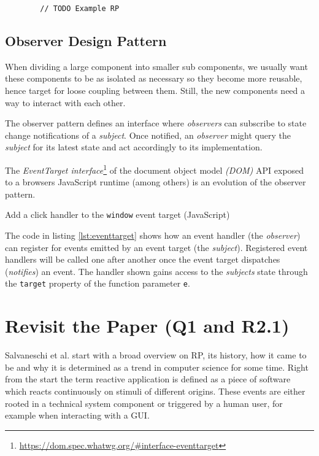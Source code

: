 \documentclass[12pt,a4paper]{article}
\begin{document}
\begin{listing}[H]
	\begin{verbatim}
		// TODO Example RP
	\end{verbatim}
	\caption{}
	\label{lst:basic-rp-with-rxjs}
\end{listing}

\subsection{Observer Design Pattern}
When dividing a large component into smaller sub components, we usually want these components to be as isolated as necessary so they become more reusable, hence target for loose coupling between them. Still, the new components need a way to interact with each other.

The observer pattern \cite{gamma1995design} defines an interface where \emph{observers} can subscribe to state change notifications of a \emph{subject}. Once notified, an \emph{observer} might query the \emph{subject} for its latest state and act accordingly to its implementation.

The \emph{EventTarget interface}\footnote{\url{https://dom.spec.whatwg.org/\#interface-eventtarget}} of the document object model \emph{(DOM)} API exposed to a browsers JavaScript runtime (among others) is an evolution of the observer pattern.

\begin{listing}[H]
	\caption{Add a click handler to the \texttt{window} event target (JavaScript)}
	\label{lst:eventtarget}
\end{listing}

The code in listing \ref{lst:eventtarget} shows how an event handler (the \emph{observer}) can register for events emitted by an event target (the \emph{subject}). Registered event handlers will be called one after another once the event target dispatches (\emph{notifies}) an event. The handler shown gains access to the \emph{subjects} state through the \texttt{target} property of the function parameter \texttt{e}.


\section{Revisit the Paper (Q1 and R2.1)}

Salvaneschi et al. start with a broad overview on RP, its history, how it came to be and why it is determined as a trend in computer science for some time. Right from the start the term reactive application is defined as a piece of software which reacts continuously on stimuli of different origins. These events are either rooted in a technical system component or triggered by a human user, for example when interacting with a GUI.
\end{document}
